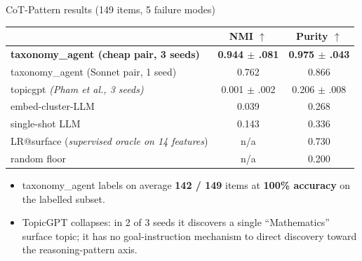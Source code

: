 \documentclass[10pt,aspectratio=169]{beamer}
\begin{document}
\begin{frame}{CoT-Pattern results (149 items, 5 failure modes)}
  \centering
  \footnotesize
  \begin{tabular}{lcc}
    \toprule
    & NMI $\uparrow$ & Purity $\uparrow$ \\
    \midrule
    \textcolor{ours}{\textbf{taxonomy\_agent (cheap pair, 3 seeds)}}
      & \textbf{0.944 $\pm$ .081} & \textbf{0.975 $\pm$ .043} \\
    taxonomy\_agent (Sonnet pair, 1 seed)
      & 0.762 & 0.866 \\
    \midrule
    topicgpt \emph{(Pham et al., 3 seeds)}
      & 0.001 $\pm$ .002 & 0.206 $\pm$ .008 \\
    embed-cluster-LLM
      & 0.039 & 0.268 \\
    single-shot LLM
      & 0.143 & 0.336 \\
    \midrule
    LR@surface (\emph{supervised oracle on 14 features})
      & n/a & 0.730 \\
    random floor
      & n/a & 0.200 \\
    \bottomrule
  \end{tabular}
  \vspace{0.7em}

  \begin{itemize}\itemsep0.1em
    \item taxonomy\_agent labels on average \textbf{142 / 149} items at
          \textbf{100\% accuracy} on the labelled subset.
    \item \textcolor{accent}{TopicGPT collapses}: in 2 of 3 seeds it
          discovers a single ``Mathematics'' surface topic; it has no
          goal-instruction mechanism to direct discovery toward the
          reasoning-pattern axis.
  \end{itemize}
\end{frame}
\end{document}
